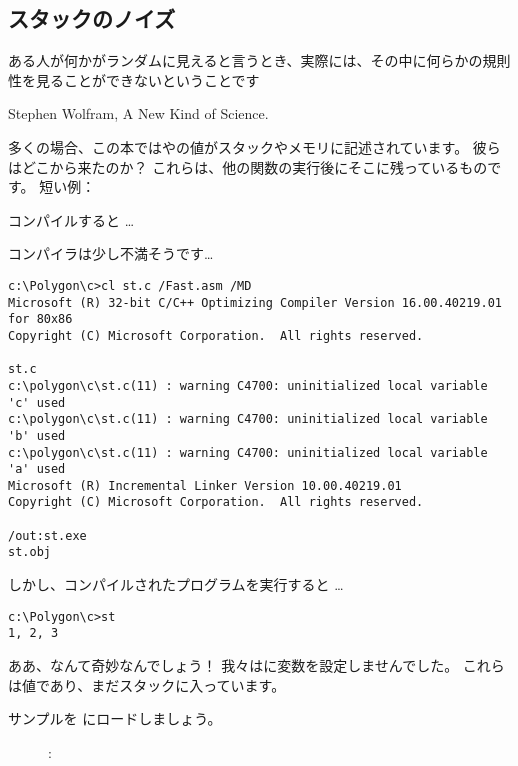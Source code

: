 \subsection{スタックのノイズ}
\label{noise_in_stack}

\epigraph{ある人が何かがランダムに見えると言うとき、実際には、その中に何らかの規則性を見ることができないということです}{Stephen Wolfram, A New Kind of Science.}

多くの場合、この本ではやの値がスタックやメモリに記述されています。
彼らはどこから来たのか？
これらは、他の関数の実行後にそこに残っているものです。 
短い例：



コンパイルすると \dots



コンパイラは少し不満そうです\dots

\begin{lstlisting}
c:\Polygon\c>cl st.c /Fast.asm /MD
Microsoft (R) 32-bit C/C++ Optimizing Compiler Version 16.00.40219.01 for 80x86
Copyright (C) Microsoft Corporation.  All rights reserved.

st.c
c:\polygon\c\st.c(11) : warning C4700: uninitialized local variable 'c' used
c:\polygon\c\st.c(11) : warning C4700: uninitialized local variable 'b' used
c:\polygon\c\st.c(11) : warning C4700: uninitialized local variable 'a' used
Microsoft (R) Incremental Linker Version 10.00.40219.01
Copyright (C) Microsoft Corporation.  All rights reserved.

/out:st.exe
st.obj
\end{lstlisting}

しかし、コンパイルされたプログラムを実行すると \dots

\begin{lstlisting}
c:\Polygon\c>st
1, 2, 3
\end{lstlisting}

ああ、なんて奇妙なんでしょう！ 我々はに変数を設定しませんでした。
これらは値であり、まだスタックに入っています。

\clearpage
サンプルを \olly にロードしましょう。

\begin{figure}[H]
\centering
{}
\caption{\olly: }
\label{fig:stack_noise_olly1}
\end{figure}

